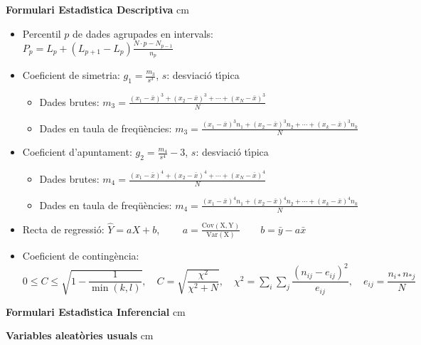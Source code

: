 \documentclass[a4paper,12pt]{article}
\begin{document}
\vskip 1cm

{\footnotesize

\textbf{Formulari Estad\'{\i}stica Descriptiva}
 cm

\begin{itemize}
\item Percentil $p$ de dades agrupades en intervals:
$
\displaystyle
P_p=L_p + (L_{p+1}-L_p) \frac{N \cdot p - N_{p-1}}{n_p}
$

\item Coeficient de simetria: $g_1=\frac{m_3}{s^3}$, $s$: desviaci\'o t\'{\i}pica
\begin{itemize}
\item Dades brutes:
$
\displaystyle
m_3=\frac{(x_1-\bar{x})^3+(x_2-\bar{x})^3+\cdots+(x_N-\bar{x})^3}{N}
$
\item Dades en taula de freq\"u\`encies:
$
\displaystyle
m_3=\frac{(x_1-\bar{x})^3 n_1+(x_2-\bar{x})^3 n_2+\cdots+(x_k-\bar{x})^3 n_k}{N}
$
\end{itemize}

\item Coeficient d'apuntament: $g_2=\frac{m_4}{s^4} - 3$, $s$: desviaci\'o t\'{\i}pica
\begin{itemize}
\item Dades brutes:
$
\displaystyle
m_4=\frac{(x_1-\bar{x})^4+(x_2-\bar{x})^4+\cdots+(x_N-\bar{x})^4}{N}
$
\item Dades en taula de freq\"u\`encies:
$
\displaystyle
m_4=\frac{(x_1-\bar{x})^4 n_1+(x_2-\bar{x})^4 n_2+\cdots+(x_k-\bar{x})^4 n_k}{N}
$
\end{itemize}

\item Recta de regressi\'o: $\hat{Y}=aX+b$, $\qquad 
a=\frac{\mathrm{Cov(X, Y)}}{\mathrm{Var(X)}} \qquad b=\bar{y}-a \bar{x}
$

\item Coeficient de conting\`encia:
$
\displaystyle
0\leq C \leq \sqrt{1-\dfrac{1}{\min(k,l)}},\quad C=\sqrt{\dfrac {\chi^2}{\chi^2+N}},\quad \chi^2=\sum_i \sum_j \dfrac {(n_{ij}-e_{ij})^2}{e_{ij}},\quad e_{ij}=\dfrac {n_{i*}n_{*j}}{N}
$


\end{itemize}

\textbf{Formulari Estad\'{\i}stica Inferencial}
 cm

\textbf{Variables aleat\`ories usuals}
 cm

}
\end{document}
